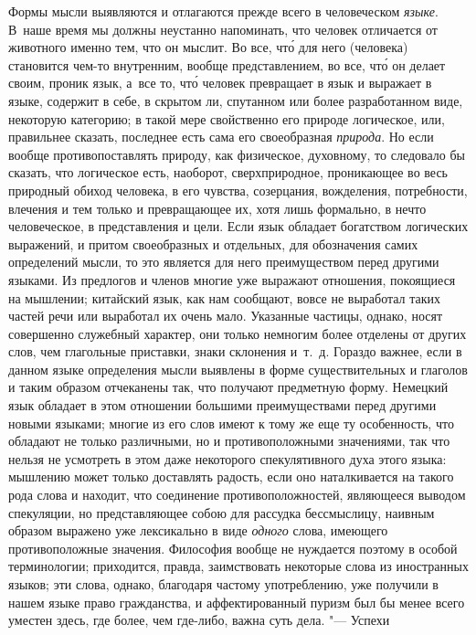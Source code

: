 Формы мысли выявляются и отлагаются прежде всего в человеческом {\em языке}.
В~наше время мы должны неустанно напоминать, что человек отличается от
животного именно тем, что он мыслит. Во все, чт\'{о} для него (человека)
становится чем-то внутренним, вообще представлением, во все, чт\'{о} он делает
своим, проник язык, а~все то, чт\'{о} человек превращает в язык и выражает в
языке, содержит в себе, в скрытом ли, спутанном или более разработанном виде,
некоторую категорию; в такой мере свойственно его природе логическое, или,
правильнее сказать, последнее есть сама его своеобразная {\em природа}. Но если
вообще противопоставлять природу, как физическое, духовному, то следовало бы
сказать, что логическое есть, наоборот, сверхприродное, проникающее во весь
природный обиход человека, в его чувства, созерцания, вожделения, потребности,
влечения и тем только и превращающее их, хотя лишь формально, в нечто
человеческое, в представления и цели. Если язык обладает богатством логических
выражений, и притом своеобразных и отдельных, для обозначения самих определений
мысли, то это является для него преимуществом перед другими языками. Из
предлогов и членов многие уже выражают отношения, покоящиеся на мышлении;
китайский язык, как нам сообщают, вовсе не выработал таких частей речи или
выработал их очень мало. Указанные частицы, однако, носят совершенно служебный
характер, они только немногим более отделены от других слов, чем глагольные
приставки, знаки склонения и~т.~д. Гораздо важнее, если в данном языке
определения мысли выявлены в форме существительных и глаголов и таким образом
отчеканены так, что получают предметную форму. Немецкий язык обладает в этом
отношении большими преимуществами перед другими новыми языками; многие из его
слов имеют к тому же еще ту особенность, что обладают не только различными, но
и противоположными значениями, так что нельзя не усмотреть в этом даже
некоторого спекулятивного духа этого языка: мышлению может только доставлять
радость, если оно наталкивается на такого рода слова и находит, что соединение
противоположностей, являющееся выводом спекуляции, но представляющее собою для
рассудка бессмыслицу, наивным образом выражено уже лексикально в виде {\em
одного} слова, имеющего противоположные значения. Философия вообще не нуждается
поэтому в особой терминологии; приходится, правда, заимствовать некоторые слова
из иностранных языков; эти слова, однако, благодаря частому употреблению, уже
получили в нашем языке право гражданства, и аффектированный пуризм был бы менее
всего уместен здесь, где более, чем где-либо, важна суть дела. "--- Успехи
